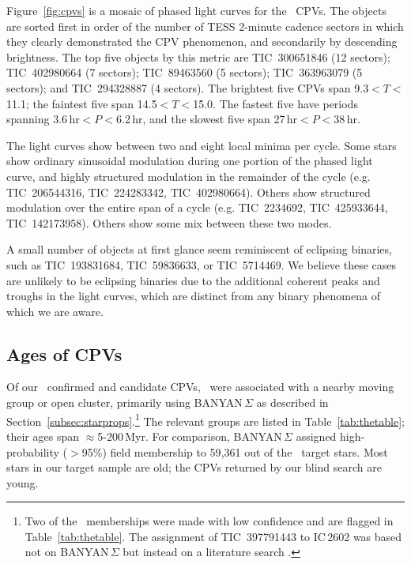 \documentclass[11pt,twocolumn,tighten]{aastex63}
\begin{document}
Figure~\ref{fig:cpvs} is a mosaic of phased light curves for the
\ngoods\ CPVs.  The objects are sorted first in order of the number of
TESS 2-minute cadence sectors in which they clearly demonstrated the
CPV phenomenon, and secondarily by descending brightness.  The top
five objects by this metric are TIC~300651846 (12 sectors);
TIC~402980664 (7 sectors); TIC~89463560 (5 sectors); TIC~363963079 (5
sectors); and TIC~294328887 (4 sectors).  The brightest five CPVs span
9.3$<$$T$$<$11.1; the faintest five span 14.5$<$$T$$<$15.0.  The
fastest five have periods spanning 3.6\,hr$<$$P$$<$6.2\,hr, and the
slowest five span 27\,hr$<$$P$$<$38\,hr.

The light curves show between two and eight local minima per cycle.
Some stars show ordinary sinusoidal modulation during one portion of
the phased light curve, and highly structured modulation in the
remainder of the cycle (e.g. TIC~206544316, TIC~224283342,
TIC~402980664).  Others show structured modulation over the entire
span of a cycle (e.g. TIC~2234692, TIC~425933644, TIC~142173958).
Others show some mix between these two modes.

A small number of objects at first glance seem reminiscent of
eclipsing binaries, such as TIC~193831684, TIC~59836633, or
TIC~5714469.  We believe these cases are unlikely to be eclipsing
binaries due to the additional coherent peaks and troughs in the light
curves, which are distinct from any binary phenomena of which we are
aware.



\subsection{Ages of CPVs}
\label{subsec:ageresults}

Of our \ncqvsnodebunked\ confirmed and candidate CPVs,
\nnotfieldbanyan\ were associated with a nearby moving group or open
cluster, primarily using BANYAN\,$\Sigma$ as described in
Section~\ref{subsec:starprops}.\footnote{Two of the \nnotfieldbanyan\
memberships were made with low confidence and are flagged in
Table~\ref{tab:thetable}.  The assignment of TIC~397791443 to IC\,2602
was based not on BANYAN\,$\Sigma$ but instead on a literature search
\citep[e.g.][]{2020A&A...633A..99C}.}  The relevant groups are listed
in Table~\ref{tab:thetable}; their ages span $\approx$5-200\,Myr.  For
comparison, BANYAN\,$\Sigma$ assigned high-probability ($>$95\%) field
membership to 59{,}361 out of the \nstarssearched\ target stars.  Most
stars in our target sample are old; the CPVs returned by our blind
search are young.
\end{document}
